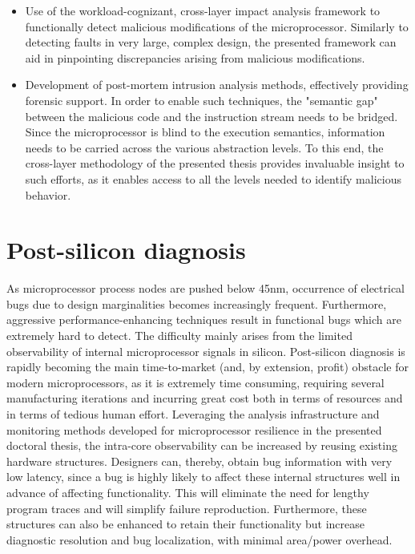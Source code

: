 \documentclass[12pt]{yalephd}
\begin{document}
\begin{itemize}
	\item Use of the workload-cognizant, cross-layer impact analysis framework to functionally detect malicious modifications of the microprocessor. Similarly to detecting faults in very large, complex design, the presented framework can aid in pinpointing discrepancies arising from malicious modifications.
	\item Development of post-mortem intrusion analysis methods, effectively providing forensic support. In order to enable such techniques, the "semantic gap" between the malicious code and the instruction stream needs to be bridged. Since the microprocessor is blind to the execution semantics, information needs to be carried across the various abstraction levels. To this end, the cross-layer methodology of the presented thesis provides invaluable insight to such efforts, as it enables access to all the levels needed to identify malicious behavior. \end{itemize}

\section{Post-silicon diagnosis}
As microprocessor process nodes are pushed below 45nm, occurrence of electrical bugs due to design marginalities becomes increasingly frequent. Furthermore, aggressive performance-enhancing techniques result in functional bugs which are extremely hard to detect. The difficulty mainly arises from the limited observability of internal microprocessor signals in silicon. Post-silicon diagnosis is rapidly becoming the main time-to-market (and, by extension, profit) obstacle for modern microprocessors, as it is extremely time consuming, requiring several manufacturing iterations and incurring great cost both in terms of resources and in terms of tedious human effort. Leveraging the analysis infrastructure and monitoring methods developed for microprocessor resilience in the presented doctoral thesis, the intra-core observability can be increased by reusing existing hardware structures. Designers can, thereby, obtain bug information with very low latency, since a bug is highly likely to affect these internal structures well in advance of affecting functionality. This will eliminate the need for lengthy program traces and will simplify failure reproduction. Furthermore, these structures can also be enhanced to retain their functionality but increase diagnostic resolution and bug localization, with minimal area/power overhead.

\backmatter



\end{document}
